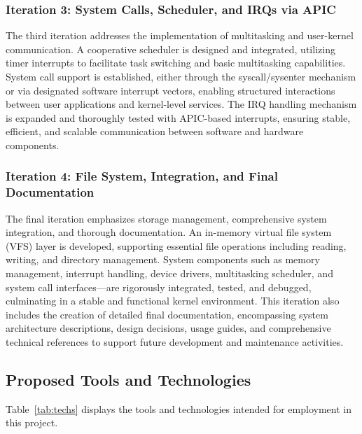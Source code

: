 \documentclass[12pt]{extarticle}
\begin{document}
\subsubsection*{Iteration 3: System Calls, Scheduler, and IRQs via APIC}

The third iteration addresses the implementation of multitasking and user-kernel communication. A cooperative scheduler is designed and integrated, utilizing timer interrupts to facilitate task switching and basic multitasking capabilities. System call support is established, either through the syscall/sysenter mechanism or via designated software interrupt vectors, enabling structured interactions between user applications and kernel-level services. The IRQ handling mechanism is expanded and thoroughly tested with APIC-based interrupts, ensuring stable, efficient, and scalable communication between software and hardware components.

\subsubsection*{Iteration 4: File System, Integration, and Final Documentation}

The final iteration emphasizes storage management, comprehensive system integration, and thorough documentation. An in-memory virtual file system (VFS) layer is developed, supporting essential file operations including reading, writing, and directory management. System components such as memory management, interrupt handling, device drivers, multitasking scheduler, and system call interfaces—are rigorously integrated, tested, and debugged, culminating in a stable and functional kernel environment. This iteration also includes the creation of detailed final documentation, encompassing system architecture descriptions, design decisions, usage guides, and comprehensive technical references to support future development and maintenance activities.
\pagebreak


\subsection{Proposed Tools and Technologies}

Table~\ref{tab:techs} displays the tools and technologies intended for
employment in this project.
\end{document}
